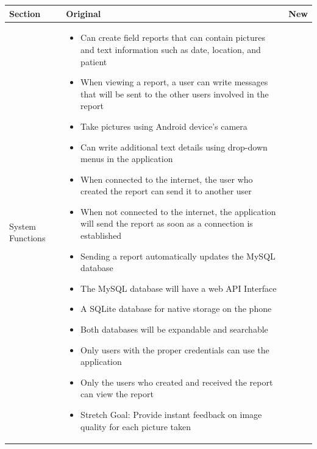 \documentclass[onecolumn, draftclsnofoot,10pt, compsoc]{IEEEtran}
\begin{document}
\begin{table}[!hbt]
\begin{tabularx}{\textwidth}{|>{\setlength\hsize{.6\hsize}\setlength\linewidth{\hsize}}X|>{\setlength\hsize{1.6\hsize}\setlength\linewidth{\hsize}}X|>{\setlength\hsize{.8\hsize}\setlength\linewidth{\hsize}}X|}
\hline

\hline
Section & Original & New \\
\hline
System Functions
&
\begin{itemize}

\item Can create field reports that can contain pictures and text information such as date, location, and patient

\item When viewing a report, a user can write messages that will be sent to the other users involved in the report

\item Take pictures using Android device's camera

\item Can write additional text details using drop-down menus in the application 

\item When connected to the internet, the user who created the report can send it to another user

\item When not connected to the internet, the application will send the report as soon as a connection is established

\item Sending a report automatically updates the MySQL database

\item The MySQL database will have a web API Interface

\item A SQLite database for native storage on the phone

\item Both databases will be expandable and searchable

\item Only users with the proper credentials can use the application

\item Only the users who created and received the report can view the report

\item Stretch Goal: Provide instant feedback on image quality for each picture taken


\end{itemize}
\end{tabularx}
\end{table}
\end{document}
